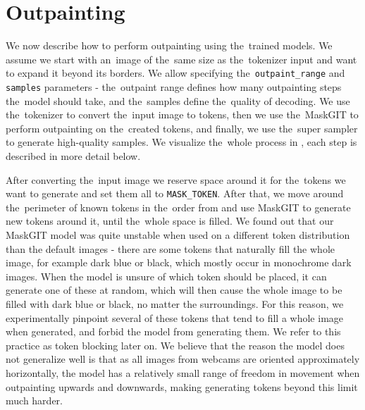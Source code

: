 \chapter{Outpainting} \label{outpainting}


We now describe how to perform outpainting using the~trained models. We assume we start with an~image of the~same size as the~tokenizer input and want to expand it beyond its borders. We allow specifying the~\texttt{outpaint\_range} and \texttt{samples} parameters - the~outpaint range defines how many outpainting steps the~model should take, and the~samples define the~quality of decoding. We use the~tokenizer to convert the~input image to tokens, then we use the~MaskGIT to perform outpainting on the~created tokens, and finally, we use the~super sampler to generate high-quality samples. We visualize the~whole process in , each step is described in more detail below.



After converting the~input image we reserve space around it for the~tokens we want to generate and set them all to \texttt{MASK\_TOKEN}. After that, we move around the~perimeter of known tokens in the~order from  and use MaskGIT to generate new tokens around it, until the~whole space is filled. We found out that our MaskGIT model was quite unstable when used on a different token distribution than the default images - there are some tokens that naturally fill the whole image, for example dark blue or black, which mostly occur in monochrome dark images. When the model is unsure of which token should be placed, it can generate one of these at random, which will then cause the whole image to be filled with dark blue or black, no matter the surroundings. For this reason, we experimentally pinpoint several of these tokens that tend to fill a whole image when generated, and forbid the model from generating them. We refer to this practice as token blocking later on. We believe that the reason the model does not generalize well is that as all images from webcams are oriented approximately horizontally, the model has a relatively small range of freedom in movement when outpainting upwards and downwards, making generating tokens beyond this limit much harder.




